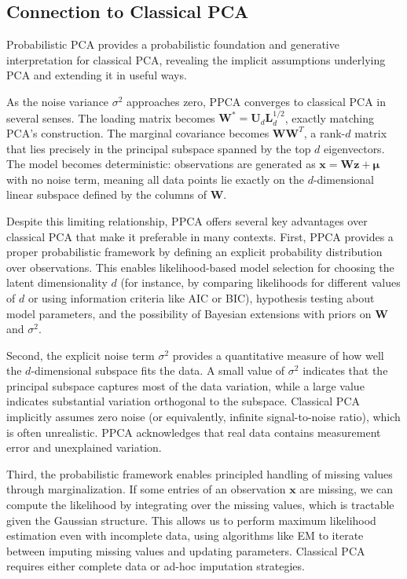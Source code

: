 \subsection*{Connection to Classical PCA}

Probabilistic PCA provides a probabilistic foundation and generative interpretation for classical PCA, revealing the implicit assumptions underlying PCA and extending it in useful ways.

As the noise variance $\sigma^2$ approaches zero, PPCA converges to classical PCA in several senses. The loading matrix becomes $\mathbf{W}^* = \mathbf{U}_d\mathbf{L}_d^{1/2}$, exactly matching PCA's construction. The marginal covariance becomes $\mathbf{W}\mathbf{W}^T$, a rank-$d$ matrix that lies precisely in the principal subspace spanned by the top $d$ eigenvectors. The model becomes deterministic: observations are generated as $\mathbf{x} = \mathbf{W}\mathbf{z} + \boldsymbol{\mu}$ with no noise term, meaning all data points lie exactly on the $d$-dimensional linear subspace defined by the columns of $\mathbf{W}$.

Despite this limiting relationship, PPCA offers several key advantages over classical PCA that make it preferable in many contexts. First, PPCA provides a proper probabilistic framework by defining an explicit probability distribution over observations. This enables likelihood-based model selection for choosing the latent dimensionality $d$ (for instance, by comparing likelihoods for different values of $d$ or using information criteria like AIC or BIC), hypothesis testing about model parameters, and the possibility of Bayesian extensions with priors on $\mathbf{W}$ and $\sigma^2$.

Second, the explicit noise term $\sigma^2$ provides a quantitative measure of how well the $d$-dimensional subspace fits the data. A small value of $\sigma^2$ indicates that the principal subspace captures most of the data variation, while a large value indicates substantial variation orthogonal to the subspace. Classical PCA implicitly assumes zero noise (or equivalently, infinite signal-to-noise ratio), which is often unrealistic. PPCA acknowledges that real data contains measurement error and unexplained variation.

Third, the probabilistic framework enables principled handling of missing values through marginalization. If some entries of an observation $\mathbf{x}$ are missing, we can compute the likelihood by integrating over the missing values, which is tractable given the Gaussian structure. This allows us to perform maximum likelihood estimation even with incomplete data, using algorithms like EM to iterate between imputing missing values and updating parameters. Classical PCA requires either complete data or ad-hoc imputation strategies.

